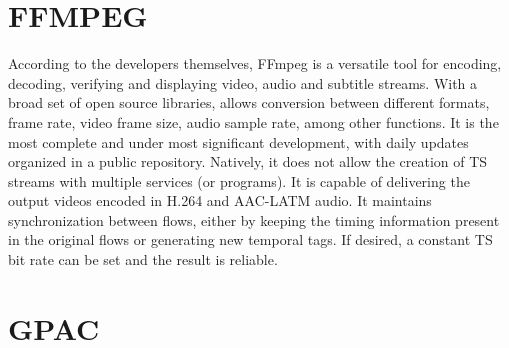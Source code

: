\documentclass[
	12pt,				%
	openright,			%
	twoside,			%
	a4paper,			%
	brazil,
	french,				%
	english
	]{abntex2}
\begin{document}


\section{FFMPEG}

According to the developers themselves, FFmpeg is a versatile tool for encoding, decoding, verifying and displaying video, audio and subtitle streams. With a broad set of open source libraries, allows conversion between different formats, frame rate, video frame size, audio sample rate, among other functions. It is the most complete and under most significant development, with daily updates organized in a public repository.
Natively, it does not allow the creation of TS streams with multiple services (or programs). It is capable of delivering the output videos encoded in H.264 and AAC-LATM audio. It maintains synchronization between flows, either by keeping the timing information present in the original flows or generating new temporal tags. If desired, a constant TS bit rate can be set and the result is reliable.


\section{GPAC}
\end{document}
